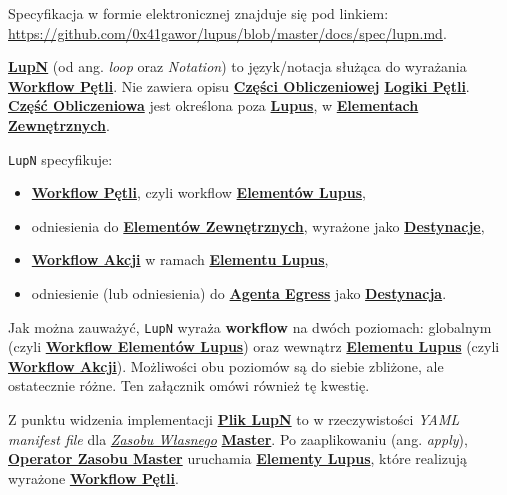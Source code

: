 \label{appendix:3}

Specyfikacja w formie elektronicznej znajduje się pod linkiem: \url{https://github.com/0x41gawor/lupus/blob/master/docs/spec/lupn.md}.


\hyperlink{def:lupn}{\textbf{LupN}} (od ang. \textit{loop} oraz \textit{Notation}) to język/notacja służąca do wyrażania \hyperlink{def:workflow-petli}{\textbf{Workflow Pętli}}. Nie zawiera opisu \hyperlink{def:czesc-obliczeniowa}{\textbf{Części Obliczeniowej}} \hyperlink{def:logika-petli}{\textbf{Logiki Pętli}}. \hyperlink{def:czesc-obliczeniowa}{\textbf{Część Obliczeniowa}} jest określona poza \hyperlink{def:lupus}{\textbf{Lupus}}, w \hyperlink{def:element-zewnetrzny}{\textbf{Elementach Zewnętrznych}}.

\texttt{LupN} specyfikuje:
\begin{itemize}
    \item \hyperlink{def:workflow-petli}{\textbf{Workflow Pętli}}, czyli workflow \hyperlink{def:element-lupus}{\textbf{Elementów Lupus}},
    \item odniesienia do \hyperlink{def:element-zewnetrzny}{\textbf{Elementów Zewnętrznych}}, wyrażone jako \hyperlink{def:destynacja}{\textbf{Destynacje}},
    \item \hyperlink{def:workflow-petli}{\textbf{Workflow Akcji}} w ramach \hyperlink{def:element-lupus}{\textbf{Elementu Lupus}},
    \item odniesienie (lub odniesienia) do \hyperlink{def:agent-egress}{\textbf{Agenta Egress}} jako \hyperlink{def:destynacja}{\textbf{Destynacja}}.
\end{itemize}

Jak można zauważyć, \texttt{LupN} wyraża \textbf{workflow} na dwóch poziomach: globalnym (czyli \hyperlink{def:workflow-petli}{\textbf{Workflow Elementów Lupus}}) oraz wewnątrz \hyperlink{def:element-lupus}{\textbf{Elementu Lupus}} (czyli \hyperlink{def:workflow-petli}{\textbf{Workflow Akcji}}). Możliwości obu poziomów są do siebie zbliżone, ale ostatecznie różne. Ten załącznik omówi również tę kwestię.


Z punktu widzenia implementacji \hyperlink{def:plik-lupn}{\textbf{Plik LupN}} to w rzeczywistości \textit{YAML manifest file} dla \hyperlink{def:zasoby-wlasne}{\textit{Zasobu Własnego}} \hyperlink{def:master}{\textbf{Master}}. Po zaaplikowaniu (ang. \textit{apply}), \hyperlink{def:operator-zasobu-master}{\textbf{Operator Zasobu Master}} uruchamia \hyperlink{def:element-lupus}{\textbf{Elementy Lupus}}, które realizują wyrażone \hyperlink{def:workflow-petli}{\textbf{Workflow Pętli}}.


